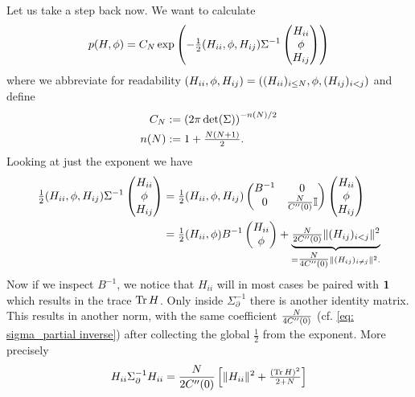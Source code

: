 Let us take a step back now. We want to calculate
\begin{equation*}
	p(H, \phi)
	=C_N\exp\left(
		-\tfrac12
		( H_{ii},\phi, H_{ij} )\Sigma^{-1}
		\begin{pmatrix}
			H_{ii}\\
			\phi\\
			H_{ij}
		\end{pmatrix}
	\right)
\end{equation*}
where we abbreviate for readability \((H_{ii}, \phi, H_{ij})= ((H_{ii})_{i\le
N}, \phi, (H_{ij})_{i<j})\) and define
\begin{align*}
	C_N &:= \left(2\pi\det(\Sigma)\right)^{-n(N)/2}\\
	n(N) &:= 1 + \tfrac{N(N+1)}{2}.
\end{align*}
Looking at just the exponent we have
\begin{align*}
		\tfrac12
		( H_{ii},\phi, H_{ij} )\Sigma^{-1}
		\begin{pmatrix}
			H_{ii}\\
			\phi\\
			H_{ij}
		\end{pmatrix}
		&= 
		\tfrac12
		( H_{ii},\phi, H_{ij} )\begin{pmatrix}
			B^{-1} & 0\\
			0 & \tfrac{N}{C''(0)}\mathbb{I}
		\end{pmatrix}
		\begin{pmatrix}
			H_{ii}\\
			\phi\\
			H_{ij}
		\end{pmatrix}\\
		&= \tfrac12(H_{ii},\phi)B^{-1}\begin{pmatrix}
			H_{ii}\\ \phi
		\end{pmatrix}
		+ \underbrace{\tfrac{N}{2C''(0)}\| (H_{ij})_{i<j}\|^2}_{
			=\tfrac{N}{4C''(0)}\| (H_{ij})_{i\neq j}\|^2.
		}
\end{align*}
Now if we inspect \(B^{-1}\), we notice that \(H_{ii}\) will in most cases be paired
with \(\mathbf{1}\) which results in the trace \(\operatorname{Tr}{H}\). Only inside \(\Sigma_\partial^{-1}\)
there is another identity matrix. This results in another norm, with the
same coefficient \(\frac{N}{4C''(0)}\) (cf. \eqref{eq: sigma_partial
inverse}) after collecting the global \(\tfrac12\) from the exponent. More
precisely
\[
	H_{ii} \Sigma_\partial^{-1} H_{ii}
	= \frac{N}{2C''(0)}
	\left[\|H_{ii}\|^2 + \tfrac{(\operatorname{Tr} H)^2}{2+N}\right]
\]
